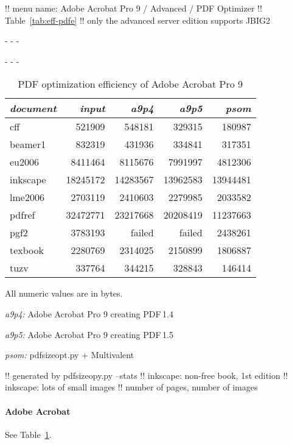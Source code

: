 \documentclass{ltugproc}
\def\cmd{\textsf}
\def\captiontop#1{%
  \advance\abovecaptionskip-\belowcaptionskip
  \advance\belowcaptionskip\abovecaptionskip
  \advance\abovecaptionskip-\belowcaptionskip
  \abovecaptionskip-\abovecaptionskip
  \caption{#1}%
  \advance\abovecaptionskip-\belowcaptionskip
  \advance\belowcaptionskip\abovecaptionskip
  \advance\abovecaptionskip-\belowcaptionskip
  \abovecaptionskip-\abovecaptionskip
}
\begin{document}
!! menu name: Adobe Acrobat Pro 9 / Advanced / PDF Optimizer
!! Table~\ref{tab:eff-pdfe}
!! only the advanced server edition supports JBIG2

\begin{table}
\captiontop{PDF optimization efficiency
of Adobe Acrobat Pro 9}\label{tab:eff-a9}
\par\small\noindent\hfil
\advance\tabcolsep-2pt  %
\begin{tabular}{@{}lrrrr@{}}
\toprule
\emph{document} & \emph{input} & \emph{a9p4} & \emph{a9p5} & \emph{psom} \\\midrule
cff         &   521909 &   548181 &   329315 &   180987 \\
beamer1     &   832319 &   431936 &   334841 &   317351 \\
eu2006      &  8411464 &  8115676 &  7991997 &  4812306 \\
inkscape    & 18245172 & 14283567 & 13962583 & 13944481 \\
lme2006     &  2703119 &  2410603 &  2279985 &  2033582 \\
pdfref      & 32472771 & 23217668 & 20208419 & 11237663 \\
pgf2        &  3783193 &   failed &   failed &  2438261 \\
texbook     &  2280769 &  2314025 &  2150899 &  1806887 \\
tuzv        &   337764 &   344215 &   328843 &   146414 \\
\bottomrule
\end{tabular}
\par\bigskip
\par\noindent All numeric values are in bytes.
\par\noindent\emph{a9p4:} Adobe Acrobat Pro 9 creating PDF\,1.4
\par\noindent\emph{a9p5:} Adobe Acrobat Pro 9 creating PDF\,1.5
\par\noindent\emph{psom:} \cmd{pdfsizeopt.py} $+$ Multivalent
\end{table}



!! generated by pdfsizeopy.py --stats
!! inkscape: non-free book, 1st edition
!! inkscape: lots of small images
!! number of pages, number of images

\paragraph{Adobe Acrobat}

See Table~\ref{tab:eff-a9}.
\end{document}
